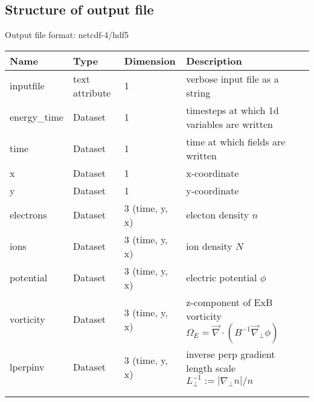 \subsection{Structure of output file}
Output file format: netcdf-4/hdf5
%
\begin{longtable}{lll>{\RaggedRight}p{7cm}}
\toprule
\rowcolor{gray!50}\textbf{Name} & 
 \textbf{Type} & \textbf{Dimension} & \textbf{Description}  \\ \midrule
inputfile  &             text attribute & 1 & verbose input file as a string \\
energy\_time             & Dataset & 1 & timesteps at which 1d variables are 
written \\
time                     & Dataset & 1 & time at which fields are written \\
x                        & Dataset & 1 & x-coordinate  \\
y                        & Dataset & 1 & y-coordinate \\
electrons                & Dataset & 3 (time, y, x) & electon density $n$ \\
ions                     & Dataset & 3 (time, y, x) & ion density $N$ \\
potential                & Dataset & 3 (time, y, x) & electric potential $\phi$  
\\
vorticity                & Dataset & 3 (time, y, x) & z-component of ExB 
vorticity  $\Omega_E = \vec{\nabla}\cdot (B^{-1} \vec{\nabla}_{\perp}\phi)$  \\
lperpinv                 & Dataset & 3 (time, y, x) & inverse perp gradient 
length scale $L_\perp^{-1} := |\nabla_\perp n| / n$ \\
\\
\\
\bottomrule
\end{longtable}




